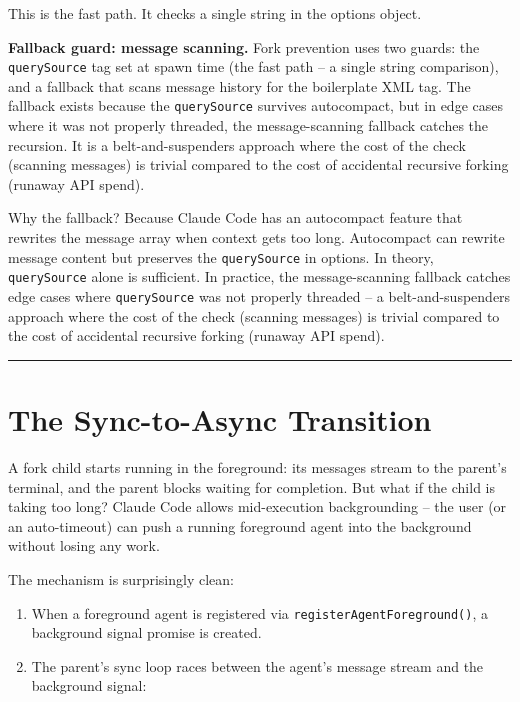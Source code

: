 \documentclass[
  english,
  11pt,
  letterpaper,
]{book}
\begin{document}
This is the fast path. It checks a single string in the options object.

\textbf{Fallback guard: message scanning.} Fork prevention uses two
guards: the \texttt{querySource} tag set at spawn time (the fast path --
a single string comparison), and a fallback that scans message history
for the boilerplate XML tag. The fallback exists because the
\texttt{querySource} survives autocompact, but in edge cases where it
was not properly threaded, the message-scanning fallback catches the
recursion. It is a belt-and-suspenders approach where the cost of the
check (scanning messages) is trivial compared to the cost of accidental
recursive forking (runaway API spend).

Why the fallback? Because Claude Code has an autocompact feature that
rewrites the message array when context gets too long. Autocompact can
rewrite message content but preserves the \texttt{querySource} in
options. In theory, \texttt{querySource} alone is sufficient. In
practice, the message-scanning fallback catches edge cases where
\texttt{querySource} was not properly threaded -- a belt-and-suspenders
approach where the cost of the check (scanning messages) is trivial
compared to the cost of accidental recursive forking (runaway API
spend).

\begin{center}\rule{0.5\linewidth}{0.5pt}\end{center}

\section{The Sync-to-Async
Transition}\label{the-sync-to-async-transition}

A fork child starts running in the foreground: its messages stream to
the parent's terminal, and the parent blocks waiting for completion. But
what if the child is taking too long? Claude Code allows mid-execution
backgrounding -- the user (or an auto-timeout) can push a running
foreground agent into the background without losing any work.

The mechanism is surprisingly clean:

\begin{enumerate}
\def\labelenumi{\arabic{enumi}.}
\item
  When a foreground agent is registered via
  \texttt{registerAgentForeground()}, a background signal promise is
  created.
\item
  The parent's sync loop races between the agent's message stream and
  the background signal:
\end{enumerate}
\end{document}
